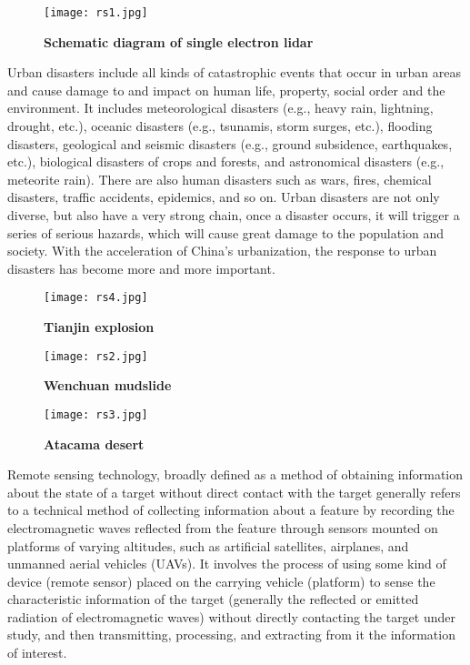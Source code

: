 \documentclass[conference]{IEEEtran}
\begin{document}
\begin{figure}[h]
    \centering
    \texttt{[image: rs1.jpg]}
    \caption{\textbf{Schematic diagram of single electron lidar}}
    \label{fig:enter-label}
\end{figure}

Urban disasters include all kinds of catastrophic events that occur in urban areas and cause damage to and impact on human life, property, social order and the environment. It includes meteorological disasters (e.g., heavy rain, lightning, drought, etc.), oceanic disasters (e.g., tsunamis, storm surges, etc.), flooding disasters, geological and seismic disasters (e.g., ground subsidence, earthquakes, etc.), biological disasters of crops and forests, and astronomical disasters (e.g., meteorite rain). There are also human disasters such as wars, fires, chemical disasters, traffic accidents, epidemics, and so on. Urban disasters are not only diverse, but also have a very strong chain, once a disaster occurs, it will trigger a series of serious hazards, which will cause great damage to the population and society. With the acceleration of China's urbanization, the response to urban disasters has become more and more important. 

\begin{figure}[h]
    \centering
    \begin{minipage}{0.49\linewidth}
        \centering
        \texttt{[image: rs4.jpg]}
        \caption{\textbf{Tianjin explosion}}
        \label{a}
    \end{minipage}
    \begin{minipage}{0.49\linewidth}
        \centering
        \texttt{[image: rs2.jpg]}
        \caption{\textbf{Wenchuan mudslide}}
        \label{b}
    \end{minipage}
    \begin{minipage}{0.8\linewidth}
        \centering
        \texttt{[image: rs3.jpg]}
        \caption{\textbf{Atacama desert}}
        \label{c}
    \end{minipage}
    \label{fig:enter-label}
\end{figure}

Remote sensing technology, broadly defined as a method of obtaining information about the state of a target without direct contact with the target generally refers to a technical method of collecting information about a feature by recording the electromagnetic waves reflected from the feature through sensors mounted on platforms of varying altitudes, such as artificial satellites, airplanes, and unmanned aerial vehicles (UAVs). It involves the process of using some kind of device (remote sensor) placed on the carrying vehicle (platform) to sense the characteristic information of the target (generally the reflected or emitted radiation of electromagnetic waves) without directly contacting the target under study, and then transmitting, processing, and extracting from it the information of interest. 
\end{document}
